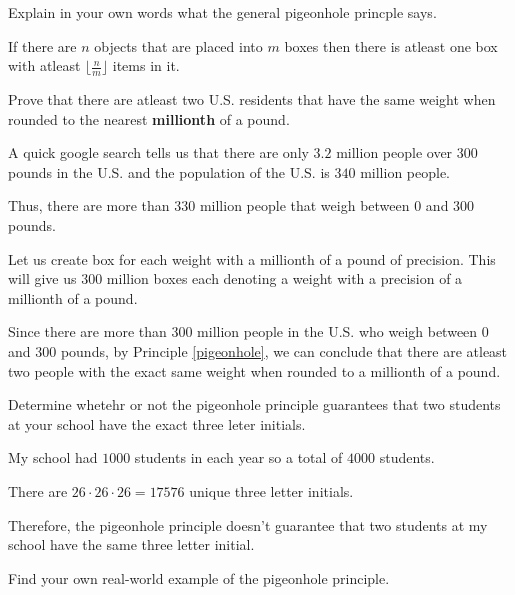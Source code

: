 \begin{problem}
	Explain in your own words what the general pigeonhole princple says.
\end{problem}

\begin{solution}
	If there are $n$ objects that are placed into $m$ boxes then there is atleast one box with atleast $\lfloor \frac{n}{m} \rfloor$ items in it.
\end{solution}


\begin{problem}
	Prove that there are atleast two U.S. residents that have the same weight when rounded to the nearest \textbf{millionth} of a pound. 
\end{problem}

\begin{solution}
	A quick google search tells us that there are only $3.2$ million people over $300$ pounds in the U.S. and the population of the U.S. is $340$ million people.

	Thus, there are more than $330$ million people that weigh between $0$ and $300$ pounds.

	Let us create box for each weight with a millionth of a pound of precision. This will give us $300$ million boxes each denoting a weight with a precision of a millionth of a pound.

	Since there are more than $300$ million people in the U.S. who weigh between $0$ and $300$ pounds, by Principle \ref{pigeonhole}, we can conclude that there are atleast two people with the exact same weight when rounded to a millionth of a pound.
\end{solution}


\begin{problem}
	Determine whetehr or not the pigeonhole principle guarantees that two students at your school have the exact three leter initials.
\end{problem}

\begin{solution}
	My school had $1000$ students in each year so a total of $4000$ students.

	There are $26 \cdot 26 \cdot 26 = 17576$ unique three letter initials.

	Therefore, the pigeonhole principle doesn't guarantee that two students at my school have the same three letter initial.
\end{solution}


\begin{problem}
	Find your own real-world example of the pigeonhole principle.
\end{problem}

